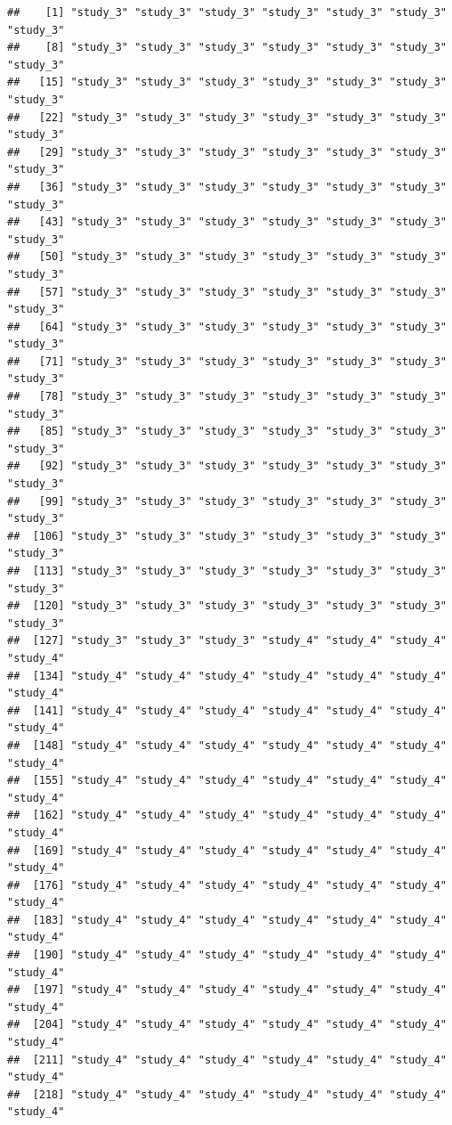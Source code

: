 \documentclass[
  american,
  man,floatsintext]{apa7}
\begin{document}
\begin{verbatim}
##    [1] "study_3" "study_3" "study_3" "study_3" "study_3" "study_3" "study_3"
##    [8] "study_3" "study_3" "study_3" "study_3" "study_3" "study_3" "study_3"
##   [15] "study_3" "study_3" "study_3" "study_3" "study_3" "study_3" "study_3"
##   [22] "study_3" "study_3" "study_3" "study_3" "study_3" "study_3" "study_3"
##   [29] "study_3" "study_3" "study_3" "study_3" "study_3" "study_3" "study_3"
##   [36] "study_3" "study_3" "study_3" "study_3" "study_3" "study_3" "study_3"
##   [43] "study_3" "study_3" "study_3" "study_3" "study_3" "study_3" "study_3"
##   [50] "study_3" "study_3" "study_3" "study_3" "study_3" "study_3" "study_3"
##   [57] "study_3" "study_3" "study_3" "study_3" "study_3" "study_3" "study_3"
##   [64] "study_3" "study_3" "study_3" "study_3" "study_3" "study_3" "study_3"
##   [71] "study_3" "study_3" "study_3" "study_3" "study_3" "study_3" "study_3"
##   [78] "study_3" "study_3" "study_3" "study_3" "study_3" "study_3" "study_3"
##   [85] "study_3" "study_3" "study_3" "study_3" "study_3" "study_3" "study_3"
##   [92] "study_3" "study_3" "study_3" "study_3" "study_3" "study_3" "study_3"
##   [99] "study_3" "study_3" "study_3" "study_3" "study_3" "study_3" "study_3"
##  [106] "study_3" "study_3" "study_3" "study_3" "study_3" "study_3" "study_3"
##  [113] "study_3" "study_3" "study_3" "study_3" "study_3" "study_3" "study_3"
##  [120] "study_3" "study_3" "study_3" "study_3" "study_3" "study_3" "study_3"
##  [127] "study_3" "study_3" "study_3" "study_4" "study_4" "study_4" "study_4"
##  [134] "study_4" "study_4" "study_4" "study_4" "study_4" "study_4" "study_4"
##  [141] "study_4" "study_4" "study_4" "study_4" "study_4" "study_4" "study_4"
##  [148] "study_4" "study_4" "study_4" "study_4" "study_4" "study_4" "study_4"
##  [155] "study_4" "study_4" "study_4" "study_4" "study_4" "study_4" "study_4"
##  [162] "study_4" "study_4" "study_4" "study_4" "study_4" "study_4" "study_4"
##  [169] "study_4" "study_4" "study_4" "study_4" "study_4" "study_4" "study_4"
##  [176] "study_4" "study_4" "study_4" "study_4" "study_4" "study_4" "study_4"
##  [183] "study_4" "study_4" "study_4" "study_4" "study_4" "study_4" "study_4"
##  [190] "study_4" "study_4" "study_4" "study_4" "study_4" "study_4" "study_4"
##  [197] "study_4" "study_4" "study_4" "study_4" "study_4" "study_4" "study_4"
##  [204] "study_4" "study_4" "study_4" "study_4" "study_4" "study_4" "study_4"
##  [211] "study_4" "study_4" "study_4" "study_4" "study_4" "study_4" "study_4"
##  [218] "study_4" "study_4" "study_4" "study_4" "study_4" "study_4" "study_4"

\end{verbatim}
\end{document}
